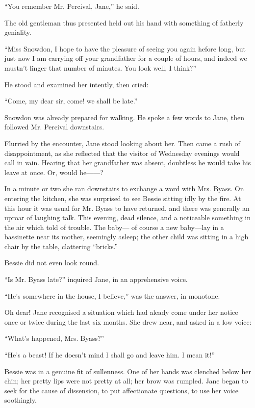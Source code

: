 ``You remember Mr. Percival, Jane,'' he said.

{\protect\hypertarget{34}{}{}}The old gentleman thus presented held out
his hand with something of fatherly geniality.

``Miss Snowdon, I hope to have the pleasure of seeing you again hefore
long, but just now I am carrying off your grandfather for a couple of
hours, and indeed we mustn't linger that number of minutes. You look
well, I think?''

He stood and examined her intently, then cried:

``Come, my dear sir, come! we shall be late.''

Snowdon was already prepared for walking. He spoke a few words to Jane,
then followed Mr. Percival downstairs.

Flurried by the encounter, Jane stood looking about her. Then came a
rush of disappointment, as she reflected that the visitor of Wednesday
evenings would call in vain. Hearing that her grandfather was absent,
doubtless he would take his leave at once. Or, would he{{------}}?

In a minute or two she ran downstairs to exchange a word with Mrs.
Byass. On {\protect\hypertarget{35}{}{}}entering the kitchen, she was
surprised to see Bessie sitting idly by the fire. At this hour it was
usual for Mr. Byass to have returned, and there was generally an uproar
of laughing talk. This evening, dead silence, and a noticeable something
in the air which told of trouble. The baby--- of course a new baby---lay
in a bassinette near its mother, seemingly asleep; the other child was
sitting in a high chair by the table, clattering ``bricks.''

Bessie did not even look round.

``Is Mr. Byass late?'' inquired Jane, in an apprehensive voice.

``He's somewhere in the house, I believe,'' was the answer, in monotone.

Oh dear! Jane recognised a situation which had aleady come under her
notice once or twice during the last six months. She drew near, and
asked in a low voice:

``What's happened, Mrs. Byass?''

``He's a beast! If he doesn't mind I shall go and leave him. I mean
it!''

Bessie was in a genuine fit of sullenness. One of her hands was clenched
below her {\protect\hypertarget{36}{}{}}chin; her pretty lips were not
pretty at all; her brow was rumpled. Jane began to seek for the cause of
dissension, to put affectionate questions, to use her voice soothingly.

